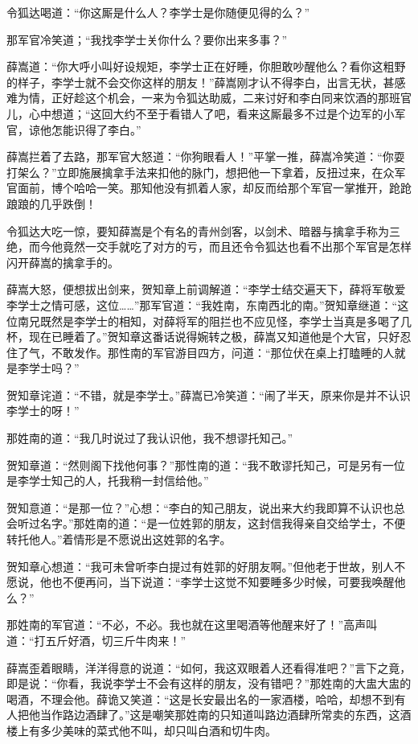 \documentclass[12pt,oneside]{book}
\begin{document}
令狐达喝道：``你这厮是什么人？李学士是你随便见得的么？''

那军官冷笑道；``我找李学士关你什么？要你出来多事？''

薛嵩道：``你大呼小叫好设规矩，李学士正在好睡，你胆敢吵醒他么？看你这粗野的样子，李学士就不会交你这样的朋友！''薛嵩刚才认不得李白，出言无状，甚感难为情，正好趁这个机会，一来为令狐达助威，二来讨好和李白同来饮酒的那班官儿，心中想道；``这回大约不至于看错人了吧，看来这厮最多不过是个边军的小军官，谅他怎能识得了李白。''

薛嵩拦着了去路，那军官大怒道：``你狗眼看人！''平掌一推，薛嵩冷笑道：``你耍打架么？''立即施展擒拿手法来扣他的脉门，想把他一下拿着，反扭过来，在众军官面前，博个哈哈一笑。那知他没有抓着人家，却反而给那个军官一掌推开，跄跄踉踉的几乎跌倒！

令狐达大吃一惊，要知薛嵩是个有名的青州剑客，以剑术、暗器与擒拿手称为三绝，而今他竟然一交手就吃了对方的亏，而且还令令狐达也看不出那个军官是怎样闪开薛嵩的擒拿手的。

薛嵩大怒，便想拔出剑来，贺知章上前调解道：``李学士结交遍天下，薛将军敬爱李学士之情可感，这位\ldots\ldots{}''那军官道：``我姓南，东南西北的南。''贺知章继道：``这位南兄既然是李学士的相知，对薛将军的阻拦也不应见怪，李学士当真是多喝了几杯，现在已睡着了。''贺知章这番话说得婉转之极，薛嵩又知道他是个大官，只好忍住了气，不敢发作。那性南的军官游目四方，问道：``那位伏在桌上打瞌睡的人就是李学士吗？''

贺知章诧道：``不错，就是李学士。''薛嵩已冷笑道：``闹了半天，原来你是并不认识李学士的呀！''

那姓南的道：``我几时说过了我认识他，我不想谬托知己。''

贺知章道：``然则阁下找他何事？''那性南的道：``我不敢谬托知己，可是另有一位是李学士知己的人，托我稍一封信给他。''

贺知意道：``是那一位？''心想：``李白的知己朋友，说出来大约我即算不认识也总会听过名字。''那姓南的道：``是一位姓郭的朋友，这封信我得亲自交给学士，不便转托他人。''着情形是不愿说出这姓郭的名字。

贺知章心想道：``我可未曾听李白提过有姓郭的好朋友啊。''但他老于世故，别人不愿说，他也不便再问，当下说道：``李学士这觉不知要睡多少时候，可要我唤醒他么？''

那姓南的军官道：``不必，不必。我也就在这里喝酒等他醒来好了！''高声叫道：``打五斤好酒，切三斤牛肉来！''

薛嵩歪着眼睛，洋洋得意的说道：``如何，我这双眼着人还看得准吧？''言下之竟，即是说：``你看，我说李学士不会有这样的朋友，没有错吧？''那姓南的大盅大盅的喝酒，不理会他。薛诡又笑道：``这是长安最出名的一家酒楼，哈哈，却想不到有人把他当作路边酒肆了。''这是嘲笑那姓南的只知道叫路边酒肆所常卖的东西，这酒楼上有多少美味的菜式他不叫，却只叫白酒和切牛肉。
\end{document}
